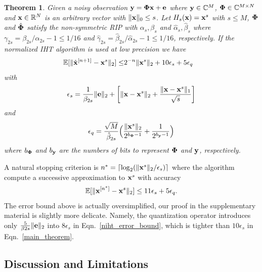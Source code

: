 \documentclass{article}
\newtheorem{theorem}{Theorem}
\begin{document}
\begin{theorem}\label{main_theorem_TH}
Given a noisy observation ${\bf y} = {\bf \Phi x}+{\bf e} $ where ${\bf y} \in \mathbb{C}^M$, ${\bf \Phi} \in \mathbb{C}^{M\times N}$ and ${\bf x} \in \mathbb{R}^N$ is an arbitrary vector with $\|{\bf x} \|_0 \leq s$. Let $H_s({\bf x}) = {\bf x}^s$ with $s\leq M$, ${\bf \Phi}$ and $\hat{\bf \Phi}$ satisfy the non-symmetric RIP with ${\alpha}_s, {\beta}_s$ and $\hat{\alpha}_s, \hat{\beta}_s$ where ${\gamma}_{2s} = {\beta}_{2s}/{\alpha}_{2s} -1 \leq 1/16$ and $\hat{\gamma}_{2s} = \hat{\beta}_{2s}/\hat{\alpha}_{2s} -1 \leq 1/16$, respectively. If the normalized IHT algorithm is used at low precision we have
\begin{equation}\label{main_theorem}
\begin{split}
        \mathbb{E}[\|\hat{{\bf x}}^{[n+1]}-{\bf x}^s\|_2]  
        \leq &2^{-n}\|{\bf x}^{s}\|_2  + 10 {\epsilon}_s + 5 {\epsilon}_q
\end{split}
\end{equation}
with 
\begin{equation}
 {\epsilon}_s = \frac{1}{\beta_{2s}}\|{\bf e} \|_2 +\bigg  [ \|{\bf x}-{\bf x}^s \|_2 + \frac{\|{\bf x}-{\bf x}^s \|_1}{\sqrt{s}}\bigg]    
\end{equation}
and
\begin{equation}
 {\epsilon}_q = \frac{\sqrt{M}}{\hat{\beta}_{2s}}\Big ( \frac{\| {\bf x}^s\|_2}{2^{b_{\bf \Phi}-1}}+\frac{1}{2^{b_{\bf y}-1}} \Big )
\end{equation}
where $b_{\bf \Phi}$ and $b_{\bf y}$ are the numbers of bits to represent ${\bf \Phi}$ and ${\bf y}$, respectively.
\end{theorem}
A natural stopping criterion is $n^* = \lceil \log_2 (\|{\bf x}^s \|_2/\epsilon_s)\rceil$ where the algorithm compute a successive approximation to ${\bf x}^s$ with accuracy
\begin{equation}
    \mathbb{E}[\|{\bf x}^{[n^*]}-{\bf x}^s \|_2] \leq 11\epsilon_s + 5\epsilon_q.
\end{equation}
The error bound above is actually oversimplified, our proof in the supplementary material is slightly more delicate. Namely, the quantization operator introduces only $\frac{5}{\beta
{2s}} \|{\bf e} \|_2$ into $8 {\epsilon}_s$ in Eqn.~\ref{niht_error_bound}, which is tighter than $10 {\epsilon}_s$ in Eqn.~\ref{main_theorem}.

\subsection{Discussion and Limitations}
\end{document}
